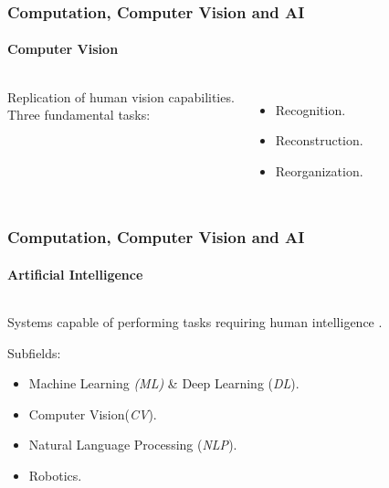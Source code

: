 \begin{frame}[t]
    \frametitle{Computation, Computer Vision and AI}
    \framesubtitle{Computer Vision}
    \begin{columns}[t]
            Replication of human vision capabilities.\\\vspace{10pt}\pause
            Three fundamental tasks\cite{malik2016three}:
            \begin{itemize}
                \item Recognition.
                \item Reconstruction.
                \item Reorganization.
            \end{itemize}
            \begin{center}
                
            \end{center}
    \end{columns}
\end{frame}
\begin{frame}[t]
    \frametitle{Computation, Computer Vision and AI}
    \framesubtitle{Artificial Intelligence}
    \begin{columns}[t]
        \begin{column}{0.5\textwidth}
        Systems capable of performing tasks requiring human intelligence 
        \cite{mccarthy2007artificial}.\\\vspace{10pt}\pause

        Subfields:
            \begin{itemize}
                \item Machine Learning \emph{(ML)} \& Deep Learning (\emph{DL}).
                \item Computer Vision(\emph{CV}).
                \item Natural Language Processing (\emph{NLP}).
                \item Robotics.
            \end{itemize}
        \end{column}
        \begin{column}{0.5\textwidth}
            \begin{center}
                
            \end{center}
        \end{column}
    \end{columns}
\end{frame}
